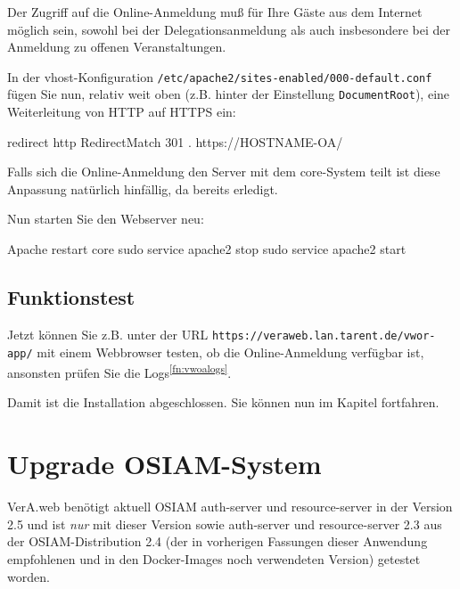 \documentclass{tarentanleitung}
\newcommand{\vwiaversosiam}{2.5}
\begin{document}
Der Zugriff auf die Online-Anmeldung muß für Ihre Gäste aus dem Internet
möglich sein, sowohl bei der Delegationsanmeldung als auch insbesondere
bei der Anmeldung zu offenen Veranstaltungen.

\begin{minipage}{\linewidth}
In der vhost-Konfiguration \texttt{/etc/apache2/sites-enabled/000-default.conf}
fügen Sie nun, relativ weit oben (z.B. hinter der Einstellung
\texttt{DocumentRoot}), eine Weiterleitung von HTTP auf HTTPS ein:

\begin{lstdump}{redirect http}
RedirectMatch 301 . https://HOSTNAME-OA/
\end{lstdump}
\end{minipage}

Falls sich die Online-Anmeldung den Server mit dem core-System teilt ist
diese Anpassung natürlich hinfällig, da bereits erledigt.

\begin{minipage}{\linewidth}
Nun starten Sie den Webserver neu:

\begin{lstdump}{Apache restart core}
sudo service apache2 stop
sudo service apache2 start
\end{lstdump}
\end{minipage}

\subsection{Funktionstest}\label{subsec:setup-oa-check}

Jetzt können Sie \dash z.B. unter der URL
\texttt{https://veraweb.lan.tarent.de/vwor-app/} \dash mit einem
Webbrowser testen, ob die Online-Anmeldung verfügbar ist, ansonsten
prüfen Sie die Logs\Hair\textsuperscript{\ref{fn:vwoalogs}}.

Damit ist die Installation abgeschlossen.
Sie können nun im Kapitel  fortfahren.

\newpage

\section{Upgrade OSIAM-System}\label{sec:upgrade-osiam}

VerA.web benötigt aktuell OSIAM auth-server und resource-server in
der Version \vwiaversosiam{} und ist \emph{nur} mit dieser Version
sowie auth-server und resource-server 2.3 aus der OSIAM-Distribution
2.4 (der in vorherigen Fassungen dieser Anwendung empfohlenen und in
den Docker-Images noch verwendeten Version) getestet worden.\keinumbruch
\end{document}
